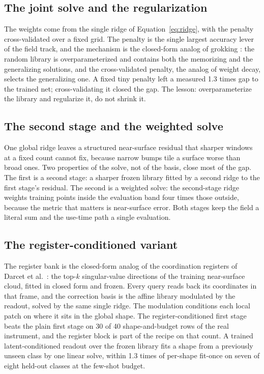 \documentclass[11pt]{article}
\begin{document}
\subsection{The joint solve and the regularization}

The weights come from the single ridge of Equation~\ref{eq:ridge},
with the penalty cross-validated over a fixed grid. The penalty is
the single largest accuracy lever of the field track, and the
mechanism is the closed-form analog of grokking \cite{nanda2023}:
the random library is overparameterized and contains both the
memorizing and the generalizing solutions, and the cross-validated
penalty, the analog of weight decay, selects the generalizing one.
A fixed tiny penalty left a measured 1.3 times gap to the trained
net; cross-validating it closed the gap. The lesson: overparameterize
the library and regularize it, do not shrink it.

\subsection{The second stage and the weighted solve}

One global ridge leaves a structured near-surface residual that
sharper windows at a fixed count cannot fix, because narrow bumps
tile a surface worse than broad ones. Two properties of the solve,
not of the basis, close most of the gap. The first is a second
stage: a sharper frozen library fitted by a second ridge to the
first stage's residual. The second is a weighted solve: the
second-stage ridge weights training points inside the evaluation
band four times those outside, because the metric that matters is
near-surface error. Both stages keep the field a literal sum and
the use-time path a single evaluation.

\subsection{The register-conditioned variant}

The register bank is the closed-form analog of the coordination
registers of Darcet et al.~\cite{darcet2023}: the top-$k$
singular-value directions of the training near-surface cloud,
fitted in closed form and frozen. Every query reads back its
coordinates in that frame, and the correction basis is the affine
library modulated by the readout, solved by the same single ridge.
The modulation conditions each local patch on where it sits in the
global shape. The register-conditioned first stage beats the plain
first stage on 30 of 40 shape-and-budget rows of the real
instrument, and the register block is part of the recipe on that
count. A trained latent-conditioned readout over the frozen library
fits a shape from a previously unseen class by one linear solve,
within 1.3 times of per-shape fit-once on seven of eight held-out
classes at the few-shot budget.
\end{document}
